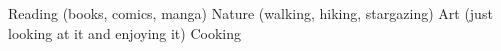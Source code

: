 %
%
%

\begin{scholarship}
	\scholarshipentry
		{\faAngleRight}
		{Reading (books, comics, manga)}
	\scholarshipentry
		{\faAngleRight}
		{Nature (walking, hiking, stargazing)}
	\scholarshipentry
		{\faAngleRight}
		{Art (just looking at it and enjoying it)}
	\scholarshipentry
		{\faAngleRight}
		{Cooking}
\end{scholarship}